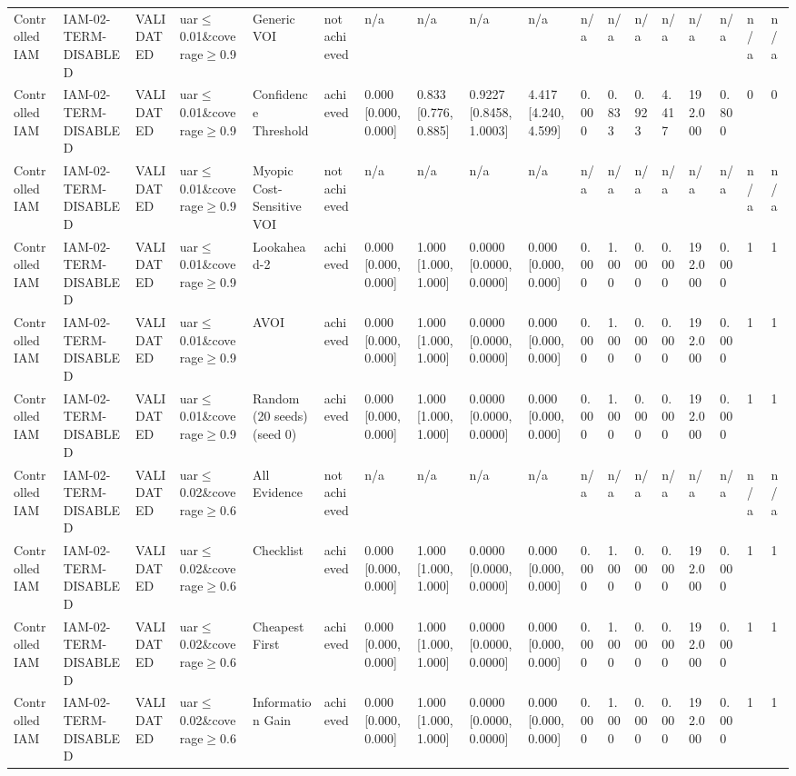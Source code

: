 \begin{table}[!ht]
{\begin{tabular}{llllllllllllllllll}
Controlled IAM & IAM-02-TERM-DISABLED & VALIDATED & uar$\le$0.01\&coverage$\ge$0.9 & Generic VOI & not achieved & n/a & n/a & n/a & n/a & n/a & n/a & n/a & n/a & n/a & n/a & n/a & n/a \\
Controlled IAM & IAM-02-TERM-DISABLED & VALIDATED & uar$\le$0.01\&coverage$\ge$0.9 & Confidence Threshold & achieved & 0.000 [0.000, 0.000] & 0.833 [0.776, 0.885] & 0.9227 [0.8458, 1.0003] & 4.417 [4.240, 4.599] & 0.000 & 0.833 & 0.923 & 4.417 & 192.000 & 0.800 & 0 & 0 \\
Controlled IAM & IAM-02-TERM-DISABLED & VALIDATED & uar$\le$0.01\&coverage$\ge$0.9 & Myopic Cost-Sensitive VOI & not achieved & n/a & n/a & n/a & n/a & n/a & n/a & n/a & n/a & n/a & n/a & n/a & n/a \\
Controlled IAM & IAM-02-TERM-DISABLED & VALIDATED & uar$\le$0.01\&coverage$\ge$0.9 & Lookahead-2 & achieved & 0.000 [0.000, 0.000] & 1.000 [1.000, 1.000] & 0.0000 [0.0000, 0.0000] & 0.000 [0.000, 0.000] & 0.000 & 1.000 & 0.000 & 0.000 & 192.000 & 0.000 & 1 & 1 \\
Controlled IAM & IAM-02-TERM-DISABLED & VALIDATED & uar$\le$0.01\&coverage$\ge$0.9 & AVOI & achieved & 0.000 [0.000, 0.000] & 1.000 [1.000, 1.000] & 0.0000 [0.0000, 0.0000] & 0.000 [0.000, 0.000] & 0.000 & 1.000 & 0.000 & 0.000 & 192.000 & 0.000 & 1 & 1 \\
Controlled IAM & IAM-02-TERM-DISABLED & VALIDATED & uar$\le$0.01\&coverage$\ge$0.9 & Random (20 seeds) (seed 0) & achieved & 0.000 [0.000, 0.000] & 1.000 [1.000, 1.000] & 0.0000 [0.0000, 0.0000] & 0.000 [0.000, 0.000] & 0.000 & 1.000 & 0.000 & 0.000 & 192.000 & 0.000 & 1 & 1 \\
Controlled IAM & IAM-02-TERM-DISABLED & VALIDATED & uar$\le$0.02\&coverage$\ge$0.6 & All Evidence & not achieved & n/a & n/a & n/a & n/a & n/a & n/a & n/a & n/a & n/a & n/a & n/a & n/a \\
Controlled IAM & IAM-02-TERM-DISABLED & VALIDATED & uar$\le$0.02\&coverage$\ge$0.6 & Checklist & achieved & 0.000 [0.000, 0.000] & 1.000 [1.000, 1.000] & 0.0000 [0.0000, 0.0000] & 0.000 [0.000, 0.000] & 0.000 & 1.000 & 0.000 & 0.000 & 192.000 & 0.000 & 1 & 1 \\
Controlled IAM & IAM-02-TERM-DISABLED & VALIDATED & uar$\le$0.02\&coverage$\ge$0.6 & Cheapest First & achieved & 0.000 [0.000, 0.000] & 1.000 [1.000, 1.000] & 0.0000 [0.0000, 0.0000] & 0.000 [0.000, 0.000] & 0.000 & 1.000 & 0.000 & 0.000 & 192.000 & 0.000 & 1 & 1 \\
Controlled IAM & IAM-02-TERM-DISABLED & VALIDATED & uar$\le$0.02\&coverage$\ge$0.6 & Information Gain & achieved & 0.000 [0.000, 0.000] & 1.000 [1.000, 1.000] & 0.0000 [0.0000, 0.0000] & 0.000 [0.000, 0.000] & 0.000 & 1.000 & 0.000 & 0.000 & 192.000 & 0.000 & 1 & 1 \\

\end{tabular}}
\end{table}
